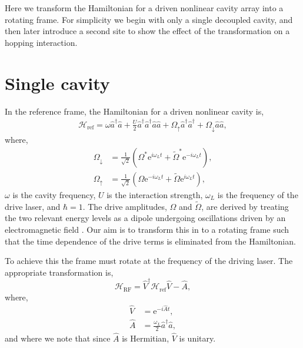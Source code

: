 Here we transform the Hamiltonian for a driven nonlinear cavity array into a rotating frame. For simplicity we begin with only a single decoupled cavity, and then later introduce a second site to show the effect of the transformation on a hopping interaction.

\section{Single cavity}

In the reference frame, the Hamiltonian for a driven nonlinear cavity is,
\begin{align}
	\mathcal{H}_{\mathrm{ref}} = \omega\hat{a}^{\dagger}\hat{a} + \frac{U}{2}\hat{a}^{\dagger}\hat{a}^{\dagger}\hat{a}\hat{a} + \Omega_{\uparrow}\hat{a}^{\dagger}\hat{a}^{\dagger} + \Omega_{\downarrow}\hat{a}\hat{a},
	\label{eq:rot1}
\end{align}
where,
\begin{align}
	\Omega_{\downarrow} &= \frac{1}{\sqrt{2}} \left( \Omega^{*}\mathrm{e}^{i\omega_{L}t} + \tilde{\Omega}^{*}\mathrm{e}^{-i\omega_{L}t} \right), \label{eq:rot2} \\
	\Omega_{\uparrow} &= \frac{1}{\sqrt{2}} \left(\Omega\mathrm{e}^{-i\omega_{L}t} + \tilde{\Omega}\mathrm{e}^{i\omega_{L}t}\right), \label{eq:rot3}
\end{align}
\(\omega\) is the cavity frequency, \(U\) is the interaction strength, \(\omega_{L}\) is the frequency of the drive laser, and \(\hbar = 1\). The drive amplitudes, \(\Omega\) and \(\tilde{\Omega}\), are derived by treating the two relevant energy levels as a dipole undergoing oscillations driven by an electromagnetic field \cite{Fox_Omega}. Our aim is to transform this in to a rotating frame such that the time dependence of the drive terms is eliminated from the Hamiltonian.

To achieve this the frame must rotate at the frequency of the driving laser. The appropriate transformation is,
\begin{equation}
	\mathcal{H}_{\mathrm{RF}} = \hat{V}^{\dagger}\mathcal{H}_{\mathrm{ref}}\hat{V} - \hat{A},
	\label{eq:rot4}
\end{equation}
where,
\begin{align}
	\hat{V} &= \mathrm{e}^{-i\hat{A}t}, \label{eq:rot5} \\
	\hat{A} &= \frac{\omega_{L}}{2} \hat{a}^{\dagger}\hat{a}, \label{eq:rot6}
\end{align}
and where we note that since \(\hat{A}\) is Hermitian, \(\hat{V}\) is unitary.

